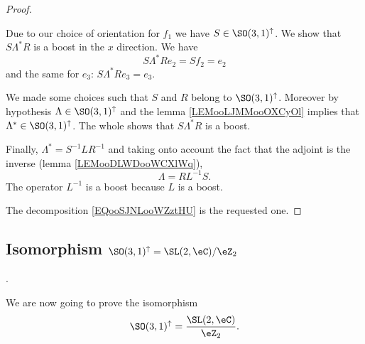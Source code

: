 \begin{proof}
\begin{subproof}
		Due to our choice of orientation for \( f_1\) we have \( S\in \SO(3,1)^{\uparrow}\).
		\spitem[Boost]
		We show that \( S\Lambda^*R\) is a boost in the \( x\) direction. We have
		\begin{equation}
			S\Lambda^*Re_2=Sf_2=e_2
		\end{equation}
		and the same for \( e_3\): \( S\Lambda^*Re_3=e_3\).

		We made some choices such that \( S\) and \( R\) belong to \( \SO(3,1)^{\uparrow}\). Moreover by hypothesis \( \Lambda\in \SO(3,1)^{\uparrow}\) and the lemma \ref{LEMooLJMMooOXCyOl} implies that \( \Lambda^*\in \SO(3,1)^{\uparrow}\). The whole shows that \( S\Lambda^*R\) is a boost.

		Finally, \( \Lambda^*=S^{-1}LR^{-1}\) and taking onto account the fact that the adjoint is the inverse (lemma \ref{LEMooDLWDooWCXlWq}),
		\begin{equation}        \label{EQooSJNLooWZztHU}
			\Lambda=RL^{-1}S.
		\end{equation}
		The operator \( L^{-1}\) is a boost because \( L\) is a boost.
	\end{subproof}
	The decomposition \eqref{EQooSJNLooWZztHU} is the requested one.
\end{proof}

\subsection{Isomorphism $\SO(3,1)^{\uparrow}= \SL(2,\eC)/ \eZ_2 $}.

We are now going to prove the isomorphism
\begin{equation}
	\SO(3,1)^{\uparrow}=\frac{ \SL(2,\eC) }{ \eZ_2 }.
\end{equation}

